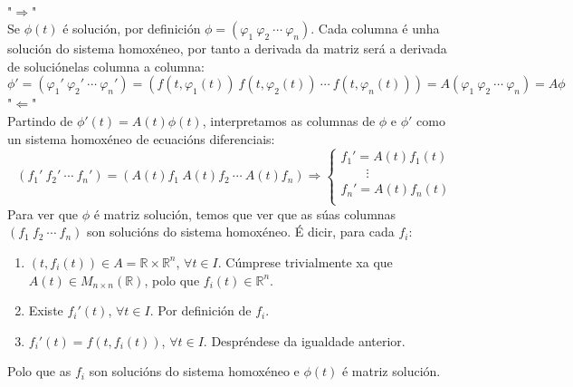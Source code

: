 \documentclass[11pt, a4paper,twoside]{article}
\makeatletter
\theoremstyle{theorem-style}  %
\renewenvironment{proof}[1][\proofname]{\par
	\pushQED{\qed}%
	\normalfont \topsep6\p@\@plus6\p@\relax
	\list{}{%
		\settowidth{\leftmargin}{\quad:\hskip\labelsep}%
		\setlength{\labelwidth}{0pt}%
		\setlength{\itemindent}{-\leftmargin}%
	}%
	\item[\hskip\labelsep\itshape#1\@addpunct{:}]\ignorespaces
}{%
	\popQED\endlist\@endpefalse
}
\theoremstyle{definition-style}
\theoremstyle{example-style}
\makeatother
\begin{document}
\begin{proof}\ \\
	"$\Rightarrow $"\\
	Se $ \phi(t) $ é solución, por definición $ \phi=(\varphi_1 \ \varphi_2\  \cdots\  \varphi_n) $. Cada columna é unha solución do sistema homoxéneo, por tanto a derivada da matriz será a derivada de soluciónelas columna a columna:
	\[ \phi' = (\varphi_1' \ \varphi_2'\  \cdots\  \varphi_n')=(f(t,\varphi_1(t)) \ f(t,\varphi_2(t))\  \cdots\  f(t,\varphi_n(t)))=A(\varphi_1 \ \varphi_2\  \cdots\  \varphi_n)=A\phi \]
	"$\Leftarrow $"\\
	Partindo de $ \phi'(t)=A(t)\phi(t) $, interpretamos as columnas de $ \phi $ e $ \phi' $ como un sistema homoxéneo de ecuacións diferenciais:
	\[ (f_1' \ f_2'\  \cdots\  f_n')=(A(t)f_1 \ A(t)f_2\  \cdots\  A(t)f_n)\Rightarrow \begin{cases}
	f_1'=A(t)f_1(t)\\
	\qquad \vdots\\
	f_n'=A(t)f_n(t)\\
	\end{cases} \]
	Para ver que $ \phi $ é matriz solución, temos que ver que as súas columnas $ (f_1 \ f_2\  \cdots\  f_n) $ son solucións do sistema homoxéneo. É dicir, para cada $ f_i $:
	\begin{enumerate}[\quad i)]
		\item $(t, f_i (t)) \in A=\mathbb{R}\times \mathbb{R}^n$, $\forall t \in I$. Cúmprese trivialmente xa que $ A(t)\in M_{n \times n} (\mathbb{R}) $, polo que $ f_i(t)\in \mathbb{R}^n $.
		\item Existe $ f_i' (t)$, $\forall t \in I$. Por definición de $ f_i $.
		\item $f_i'(t)=f(t, f_i(t))$,  $\forall t \in I$. Despréndese da igualdade anterior.
	\end{enumerate}
	Polo que as $ f_i $ son solucións do sistema homoxéneo e $ \phi(t) $ é matriz solución.
\end{proof}
\end{document}
